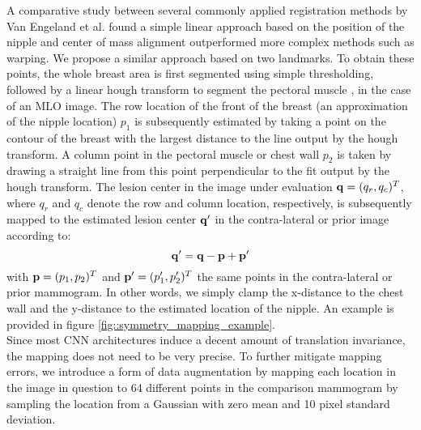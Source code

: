 \documentclass[12pt]{spieman}  %
\begin{document}
A comparative study between several commonly applied registration methods by Van Engeland et al. \cite{Enge03} found a simple linear approach based on the position of the nipple and center of mass alignment outperformed more complex methods such as warping. We propose a similar approach based on two landmarks. To obtain these points, the whole breast area is first segmented using simple thresholding, followed by a linear hough transform to segment the pectoral muscle \cite{Kars98}, in the case of an MLO image. The row location of the front of the breast (an approximation of the nipple location) $p_{1}$ is subsequently estimated by taking a point on the contour of the breast with the largest distance to the line output by the hough transform. A column point in the pectoral muscle or chest wall $p_{2}$ is taken by drawing a straight line from this point perpendicular to the fit output by the hough transform. The lesion center in the image under evaluation ${\bf q} = (q_{r}, q_{c})^{T}$, where $q_{r}$ and $q_{c}$ denote the row and column location, respectively, is subsequently mapped to the estimated lesion center ${\bf q}'$ in the contra-lateral or prior image according to:
\begin{equation}{\bf q'} = {\bf q} - {\bf p} + {\bf p'}
\end{equation}
with ${\bf p} = (p_{1}, p_{2})^{T}$ and ${\bf p'} = (p'_{1}, p'_{2})^{T}$ the same points in the contra-lateral or prior mammogram. In other words, we simply clamp the x-distance to the chest wall and the y-distance to the estimated location of the nipple. An example is provided in figure \ref{fig::symmetry_mapping_example}.\\

Since most CNN architectures induce a decent amount of translation invariance, the mapping does not need to be very precise. To further mitigate mapping errors, we introduce a form of data augmentation by mapping each location in the image in question to 64 different points in the comparison mammogram by sampling the location from a Gaussian with zero mean and 10 pixel standard deviation. 
\end{document}
